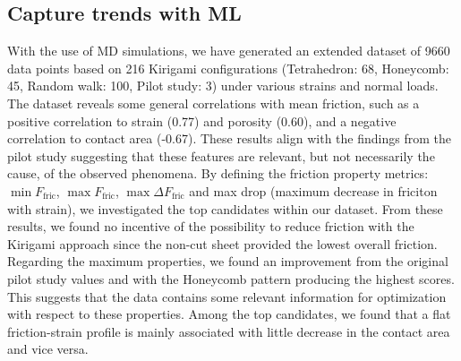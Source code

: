 \subsection{Capture trends with ML}
With the use of \acrshort{MD} simulations, we have generated an extended dataset
of 9660 data points based on 216 Kirigami configurations (Tetrahedron: 68,
Honeycomb: 45, Random walk: 100, Pilot study: 3) under various strains and normal loads. The dataset reveals some general correlations with mean friction,
such as a positive correlation to strain (0.77)
and porosity (0.60), and a negative correlation to contact area (-0.67). These
results align with the findings from the pilot study suggesting that these
features are relevant, but not necessarily the cause, of the observed phenomena.
By defining the friction property metrics: $\min F_{\text{fric}}$,  $\max
F_{\text{fric}}$, $\max \Delta F_{\text{fric}}$ and max drop (maximum decrease in friciton with strain), we investigated
the top candidates within our dataset. From these results, we found no incentive of the possibility to reduce friction with the Kirigami approach since
the non-cut sheet provided the lowest overall friction. Regarding the maximum
properties, we found an improvement from the original pilot study values and
with the Honeycomb pattern producing the highest scores. This suggests that the data contains some relevant information for optimization with respect to
these properties. Among the top candidates, we found that a flat friction-strain profile is mainly associated with little decrease in the
contact area and vice versa. 

